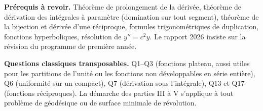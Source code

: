 \documentclass[11pt,a4paper]{article}
\begin{document}
\textbf{Prérequis à revoir.} Théorème de prolongement de la dérivée, théorème de dérivation des intégrales à paramètre (domination sur tout segment), théorème de la bijection et dérivée d'une réciproque, formules trigonométriques de duplication, fonctions hyperboliques, résolution de \(y''=c^2y\). Le rapport 2026 insiste sur la révision du programme de première année.

\textbf{Questions classiques transposables.} Q1--Q3 (fonctions plateau, aussi utiles pour les partitions de l'unité ou les fonctions non développables en série entière), Q6 (uniformité sur un compact), Q7 (dérivation sous l'intégrale), Q13 et Q17 (fonctions réciproques). La démarche des parties III à V s'applique à tout problème de géodésique ou de surface minimale de révolution.
\end{document}
